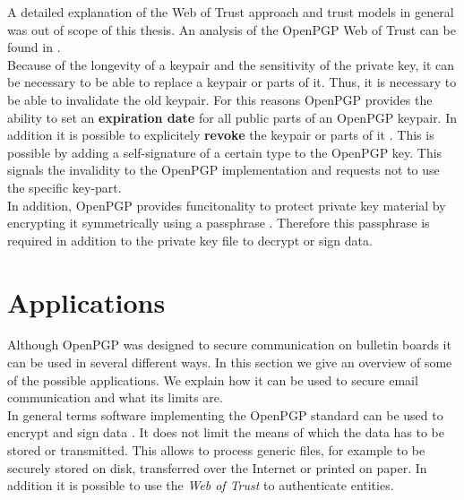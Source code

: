 A detailed explanation of the Web of Trust approach and trust models in general was out of scope of this thesis. An analysis of the OpenPGP Web of Trust can be found in \cite{Ulrich2011}. \\


Because of the longevity of a keypair and the sensitivity of the private key, it can be necessary to be able to replace a keypair or parts of it. Thus, it is necessary to be able to invalidate the old keypair. For this reasons OpenPGP provides the ability to set an \textbf{expiration date} for all public parts of an OpenPGP keypair. In addition it is possible to explicitely \textbf{revoke} the keypair or parts of it \cite[section 5.2]{RFC4880}. This is possible by adding a self-signature of a certain type to the OpenPGP key. This signals the invalidity to the OpenPGP implementation and requests not to use the specific key-part. \\


In addition, OpenPGP provides funcitonality to protect private key material by encrypting it symmetrically using a passphrase \cite[section 3.7]{RFC4880}. Therefore this passphrase is required in addition to the private key file to decrypt or sign data.

\section{Applications} \label{section:openpgp:applications}

Although OpenPGP was designed to secure communication on bulletin boards it can be used in several different ways. In this section we give an overview of some of the possible applications. We explain how it can be used to secure email communication and what its limits are.  \\


In general terms software implementing the OpenPGP standard can be used to encrypt and sign data \cite[section 2]{RFC4880}. It does not limit the means of which the data has to be stored or transmitted. This allows to process generic files, for example to be securely stored on disk, transferred over the Internet or printed on paper. In addition it is possible to use the \textit{Web of Trust} to authenticate entities. \\  


